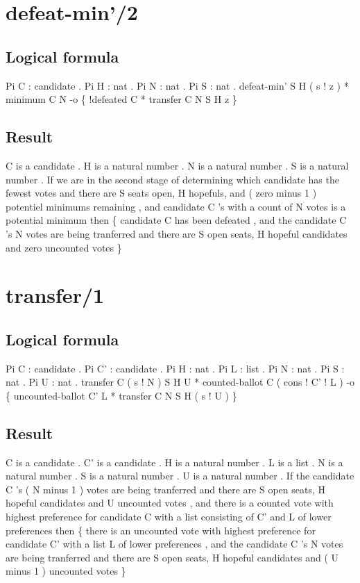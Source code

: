 \section{defeat-min'/2}
\subsection{Logical formula}
\begin{texto2}
	Pi C : candidate . Pi H : nat . Pi N : nat . Pi S : nat . defeat-min' S H ( s ! z ) * minimum C N -o \{ !defeated C * transfer C N S H z \}
\end{texto2}

\subsection{Result}
\begin{texto2}
	C is a candidate . H is a natural number . N is a natural number . S is a natural number . If we are in the second stage of determining which candidate has the fewest votes and there are S seats open, H hopefuls, and ( zero minus 1 ) potentiel minimums remaining , and candidate C 's with a count of N votes is a potential minimum then \{ candidate C has been defeated , and the candidate C 's N votes are being tranferred and there are S open seats, H hopeful candidates and zero uncounted votes \}
\end{texto2}

\section{transfer/1}
\subsection{Logical formula}
\begin{texto2}
	Pi C : candidate . Pi C' : candidate . Pi H : nat . Pi L : list . Pi N : nat . Pi S : nat . Pi U : nat . transfer C ( s ! N ) S H U * counted-ballot C ( cons ! C' ! L ) -o \{ uncounted-ballot C' L * transfer C N S H ( s ! U ) \}
\end{texto2}

\subsection{Result}
\begin{texto2}
	C is a candidate . C' is a candidate . H is a natural number . L is a list . N is a natural number . S is a natural number . U is a natural number . If the candidate C 's ( N minus 1 ) votes are being tranferred and there are S open seats, H hopeful candidates and U uncounted votes , and there is a counted vote with highest preference for candidate C with a list consisting of C' and L of lower preferences then \{ there is an uncounted vote with highest preference for candidate C' with a list L of lower preferences , and the candidate C 's N votes are being tranferred and there are S open seats, H hopeful candidates and ( U minus 1 ) uncounted votes \}
\end{texto2}


